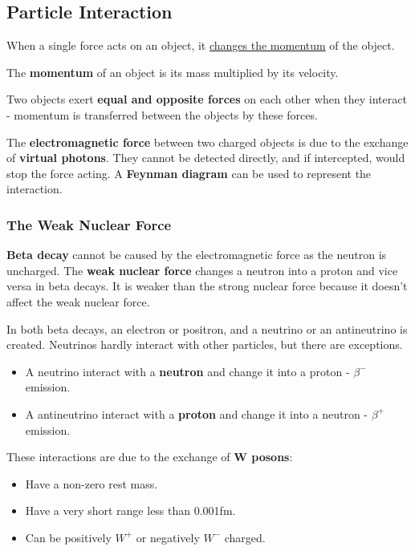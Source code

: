 \subsection{Particle Interaction}

When a single force acts on an object, it \underline{changes the momentum} of the object.

The \textbf{momentum} of an object is its mass multiplied by its velocity.

Two objects exert \textbf{equal and opposite forces} on each other when they interact - momentum is transferred between the objects by these forces.

The \textbf{electromagnetic force} between two charged objects is due to the exchange of \textbf{virtual photons}. They cannot be detected directly, and if intercepted, would stop the force acting. A \textbf{Feynman diagram} can be used to represent the interaction.

\subsubsection*{The Weak Nuclear Force}

\textbf{Beta decay} cannot be caused by the electromagnetic force as the neutron is uncharged. The \textbf{weak nuclear force} changes a neutron into a proton and vice versa in beta decays. It is weaker than the strong nuclear force because it doesn't affect the weak nuclear force.

In both beta decays, an electron or positron, and a neutrino or an antineutrino is created. Neutrinos hardly interact with other particles, but there are exceptions.
\begin{itemize}
    \item A neutrino interact with a \textbf{neutron} and change it into a proton - $\beta^-$ emission.
    \item A antineutrino interact with a \textbf{proton} and change it into a neutron - $\beta^+$ emission.
\end{itemize}

These interactions are due to the exchange of \textbf{W posons}:
\begin{itemize}
    \item Have a non-zero rest mass.
    \item Have a very short range less than 0.001fm.
    \item Can be positively $W^+$ or negatively $W^-$ charged.
\end{itemize}

